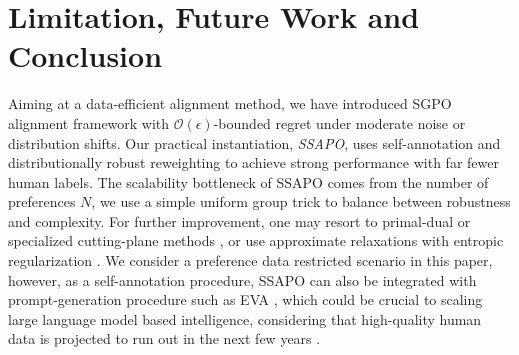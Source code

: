 \section{Limitation, Future Work and Conclusion}
\label{sec:conclusion}
Aiming at a data-efficient alignment method, we have introduced SGPO alignment framework with $\mathcal{O}(\epsilon)$-bounded regret under moderate noise or distribution shifts. Our practical instantiation, \emph{SSAPO}, uses self-annotation and distributionally robust reweighting to achieve strong performance with far fewer human labels. The scalability bottleneck of SSAPO comes from the number of preferences $N$, we use a simple uniform group trick to balance between robustness and complexity. For further improvement, one may resort to primal-dual or specialized cutting-plane methods \citep{Esfahani2018Data}, or use approximate relaxations with 
entropic regularization \citep{Cuturi2013Sinkhorn}. We consider a preference data restricted scenario in this paper, however, as a self-annotation procedure, SSAPO can also be integrated with prompt-generation procedure such as EVA \citep{Ye2024Evolving}, which could be crucial to scaling large language model based intelligence, considering that high-quality human data is projected to run out in the next few years \citep{Villalobos2024Will}.
